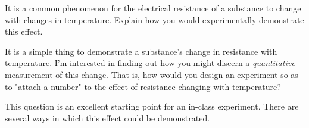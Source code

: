 

It is a common phenomenon for the electrical resistance of a substance to change with changes in temperature.  Explain how you would experimentally demonstrate this effect.







It is a simple thing to demonstrate a substance's change in resistance with temperature.  I'm interested in finding out how you might discern a {\it quantitative} measurement of this change.  That is, how would you design an experiment so as to "attach a number" to the effect of resistance changing with temperature?







This question is an excellent starting point for an in-class experiment.  There are several ways in which this effect could be demonstrated.




